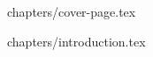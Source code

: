 \documentclass[a4paper,12pt]{article}
\begin{document}


{chapters/cover-page.tex}

\tableofcontents
\clearpage

{chapters/introduction.tex}



\end{document}
